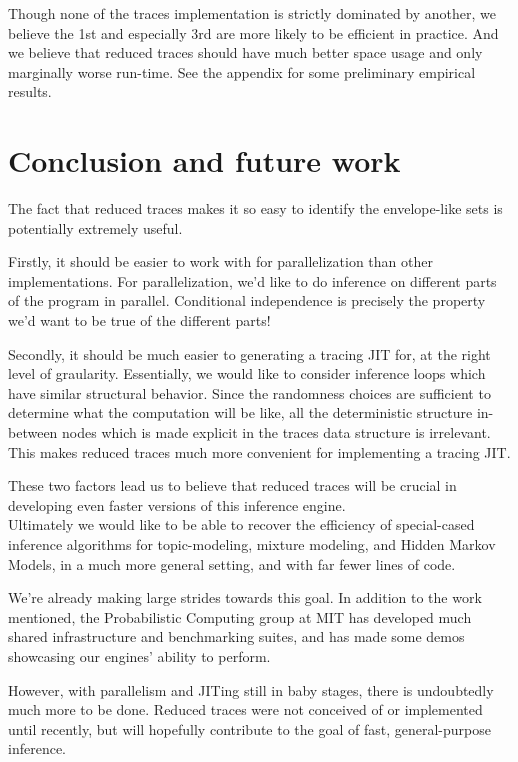 \documentclass[10pt]{article}
\begin{document}
Though none of the traces implementation is strictly dominated by another, we believe the 1st and especially 3rd are more likely to be efficient in practice.  And we believe that reduced traces should have much better space usage and only marginally worse run-time.  See the appendix for some preliminary empirical results.


\section{Conclusion and future work}

The fact that reduced traces makes it so easy to identify the envelope-like sets is potentially extremely useful.

Firstly, it should be easier to work with for parallelization than other implementations.  For parallelization, we'd like to do inference on different parts of the program in parallel.  Conditional independence is precisely the property we'd want to be true of the different parts!

Secondly, it should be much easier to generating a tracing JIT for, at the right level of graularity.  Essentially, we would like to consider inference loops which have similar structural behavior.  Since the randomness choices are sufficient to determine what the computation will be like, all the deterministic structure in-between nodes which is made explicit in the traces data structure is irrelevant.  This makes reduced traces much more convenient for implementing a tracing JIT.  

These two factors lead us to believe that reduced traces will be crucial in developing even faster versions of this inference engine.  \\

Ultimately we would like to be able to recover the efficiency of special-cased inference algorithms for topic-modeling, mixture modeling, and Hidden Markov Models, in a much more general setting, and with far fewer lines of code.  


We're already making large strides towards this goal.  In addition to the work mentioned, the Probabilistic Computing group at MIT has developed much shared infrastructure and benchmarking suites, and has made some demos showcasing our engines' ability to perform.  

However, with parallelism and JITing still in baby stages, there is undoubtedly much more to be done.  Reduced traces were not conceived of or implemented until recently, but will hopefully contribute to the goal of fast, general-purpose inference.
\end{document}
